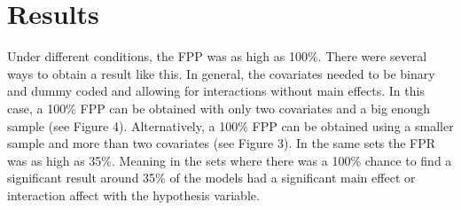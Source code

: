 \section{Results} 
Under different conditions, the FPP was as high as 100\%. There were several ways to obtain a result like this. In general, the covariates needed to be binary and dummy coded and allowing for interactions without main effects. In this case, a 100\% FPP can be obtained with only two covariates and a big enough sample (see Figure 4). Alternatively, a 100\% FPP can be obtained using a smaller sample and more than two covariates (see Figure 3). In the same sets the FPR was as high as 35\%. Meaning in the sets where there was a 100\% chance to find a significant result around 35\% of the models had a significant main effect or interaction affect with the hypothesis variable. 

